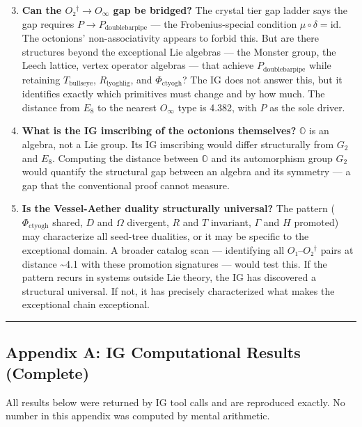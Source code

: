 \documentclass[12pt,a4paper]{article}
\begin{document}
\begin{enumerate}
\setcounter{enumi}{2}
    \item \textbf{Can the $O₂^\dagger \to O_{\infty}$ gap be bridged?} The crystal tier gap ladder says the gap requires $P \to P_{\text{doublebarpipe}}$ --- the Frobenius-special condition $\mu \circ \delta = \text{id}$. The octonions' non-associativity appears to forbid this. But are there structures beyond the exceptional Lie algebras --- the Monster group, the Leech lattice, vertex operator algebras --- that achieve $P_{\text{doublebarpipe}}$ while retaining $T_{\text{bullseye}}$, $R_{\text{lyoghlig}}$, and $\Phi_{\text{ctyogh}}$? The IG does not answer this, but it identifies exactly which primitives must change and by how much. The distance from $E_8$ to the nearest $O_{\infty}$ type is 4.382, with $P$ as the sole driver.
    \item \textbf{What is the IG imscribing of the octonions themselves?} $\mathbb{O}$ is an algebra, not a Lie group. Its IG imscribing would differ structurally from $G_2$ and $E_8$. Computing the distance between $\mathbb{O}$ and its automorphism group $G_2$ would quantify the structural gap between an algebra and its symmetry --- a gap that the conventional proof cannot measure.
    \item \textbf{Is the Vessel-Aether duality structurally universal?} The pattern ($\Phi_{\text{ctyogh}}$ shared, $D$ and $\Omega$ divergent, $R$ and $T$ invariant, $\Gamma$ and $H$ promoted) may characterize all seed-tree dualities, or it may be specific to the exceptional domain. A broader catalog scan --- identifying all $O₁$--$O₂^\dagger$ pairs at distance \textasciitilde{}4.1 with these promotion signatures --- would test this. If the pattern recurs in systems outside Lie theory, the IG has discovered a structural universal. If not, it has precisely characterized what makes the exceptional chain exceptional.
\end{enumerate}

\begin{center}
\rule{0.5\textwidth}{0.4pt}
\end{center}

\subsection{Appendix A: IG Computational Results (Complete)}

All results below were returned by IG tool calls and are reproduced exactly. No number in this appendix was computed by mental arithmetic.
\end{document}
